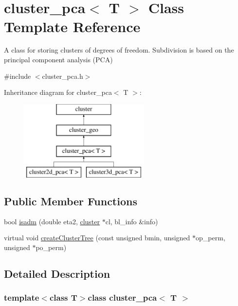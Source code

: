 \hypertarget{classcluster__pca}{
\section{cluster\-\_\-pca$<$ \-T $>$ \-Class \-Template \-Reference}
\label{classcluster__pca}
}


\-A class for storing clusters of degrees of freedom. \-Subdivision is based on the principal component analysis (\-P\-C\-A)  




{\ttfamily \#include $<$cluster\-\_\-pca.\-h$>$}

\-Inheritance diagram for cluster\-\_\-pca$<$ \-T $>$\-:\begin{figure}[H]
\begin{center}
\leavevmode
\includegraphics[height=4.000000cm]{classcluster__pca}
\end{center}
\end{figure}
\subsection*{\-Public \-Member \-Functions}
\begin{DoxyCompactItemize}
\item 
bool \hyperlink{classcluster__pca_a4546575a6d4e83e4d8ab6131019fae95}{isadm} (double eta2, \hyperlink{classcluster}{cluster} $\ast$cl, bl\-\_\-info \&info)
\item 
virtual void \hyperlink{classcluster__pca_a269105a7c9520bdcc566a858fbf6b763}{create\-Cluster\-Tree} (const unsigned bmin, unsigned $\ast$op\-\_\-perm, unsigned $\ast$po\-\_\-perm)
\end{DoxyCompactItemize}


\subsection{\-Detailed \-Description}
\subsubsection*{template$<$class \-T$>$class cluster\-\_\-pca$<$ T $>$}

